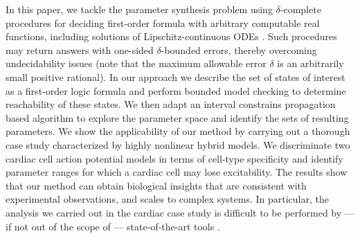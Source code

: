 In this paper, we tackle the parameter synthesis problem using $\delta$-complete procedures \cite{gao12a} 
for deciding first-order formula with arbitrary computable real functions, including solutions 
of Lipschitz-continuous ODEs \citep{gao12b}. Such procedures may return answers with
one-sided $\delta$-bounded errors, thereby overcoming undecidability issues (note that the maximum 
allowable error $\delta$ is an arbitrarily small positive rational). In our approach we describe 
the set of states of interest as a first-order logic formula and perform bounded model checking \cite{BMC}
to determine reachability of these states. We then adapt an interval constrains propagation based algorithm 
to explore the parameter space and identify the sets of resulting parameters. 
We show the applicability of our method by carrying out a thorough case study characterized by 
highly nonlinear hybrid models. We discriminate two cardiac cell action potential 
models \cite{fenton98,orovio08} in terms of cell-type specificity and identify parameter ranges for which a cardiac cell may lose excitability.
The results show that our method can obtain biological insights that are consistent with experimental observations, 
and scales to complex systems. 
In particular, the analysis we carried out in the cardiac case study is difficult to be performed by --- if not out of the scope of ---  state-of-the-art tools \cite{prism,breach,taliro,biocham}.

